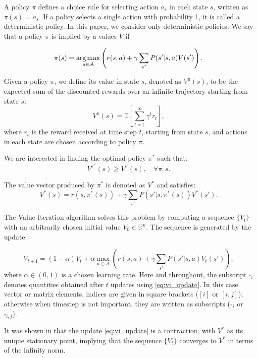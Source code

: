 \documentclass{article}
\begin{document}
A policy $\pi$ defines a choice rule for selecting action $a_s$ in each state $s$, written as $\pi(s) = a_s$. If a policy selects a single action with probability 1, it is called a deterministic policy. In this paper, we consider only deterministic policies. We say that a policy $\pi$ is implied by a values $V$ if  

\begin{equation*}
\pi(s) = \operatorname*{arg\,max}_{a \in \mathcal{A}} \left( r(s,a) + \gamma \sum_{s'} P(s'|s,a)V(s') \right).
\end{equation*}

Given a policy $\pi$, we define its value in state $s$, denoted as $V^\pi(s)$, to be the expected sum of the discounted rewards over an infinite trajectory starting from state $s$:
\begin{equation*}
V^\pi (s) = \mathbb{E} \left[ \sum_{t=1}^{\infty} \gamma^t r_t \right],    
\end{equation*} 
where $r_t$ is the reward received at time step $t$, starting from state $s$, and actions in each state are chosen according to policy $\pi$.

We are interested in finding the optimal policy $\pi^*$ such that:
\[
V^{\pi^*} (s) \geq V^\pi(s), \quad \forall \pi, s.
\]

The value vector produced by $\pi^*$ is denoted as $V^*$ and satisfies:
\[
V^*(s) = r(s,\pi^*(s)) + \gamma \sum_{s'} P(s'|s,\pi^*(s)) V^*(s').
\]

The Value Iteration algorithm solves this problem by computing a sequence $\{V_t\}$ with an arbitrarily chosen initial value $V_0 \in \mathbb{R}^n$. The sequence is generated by the update:

\begin{equation} \label{eq:vi_update}
V_{t+1} = (1-\alpha)V_t + \alpha \max_{a \in \mathcal{A}} \left( r(s,a) + \gamma \sum_{s'}P(s'|s,a)V_t(s') \right),
\end{equation}
where $\alpha \in (0,1)$ is a chosen learning rate. Here and throughout, the subscript $\square_t$ denotes quantities obtained after $t$ updates using \eqref{eq:vi_update}. In this case. vector or matrix elements, indices are given in square brackets ($[i]$ or $[i,j]$); otherwise when timestep is not important, they are written as subscripts ($\square_i$ or $\square_{i,j}$).

It was shown in \cite{howard1960dynamic} that the update \eqref{eq:vi_update} is a contraction, with $V^*$ as its unique stationary point, implying that the sequence $\{V_t\}$ converges to $V^*$ in terms of the infinity norm.
\end{document}
